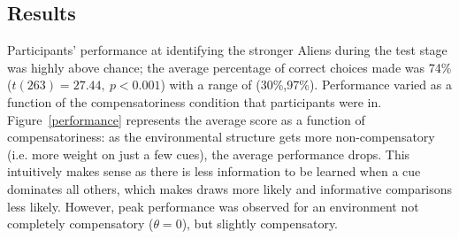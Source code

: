 \documentclass[10pt,letterpaper]{article}
\begin{document}
\subsection{Results}
Participants' performance at identifying the stronger Aliens during the test stage was highly above chance; the average percentage of correct choices made was 74\% ($t(263) = 27.44,~p< 0.001$) with a range of (30\%,97\%). Performance varied as a function of the compensatoriness condition that participants were in. Figure~\ref{performance} represents the average score as a function of compensatoriness: as the environmental structure gets more non-compensatory (i.e. more weight on just a few cues), the average performance drops. This intuitively makes sense as there is less information to be learned when a cue dominates all others, which makes draws more likely and informative comparisons less likely.  However, peak performance was observed for an environment not completely compensatory ($\theta=0$), but slightly compensatory.
 
\end{document}
